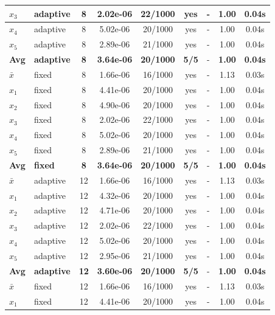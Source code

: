 \begin{longtable}{|l|l|c|c|c|c|c|c|c|}
\hline
$x_3$ & adaptive & 8 & 2.02e-06 & 22/1000 & yes & - & 1.00 & 0.04s \\
\hline
$x_4$ & adaptive & 8 & 5.02e-06 & 20/1000 & yes & - & 1.00 & 0.04s \\
\hline
$x_5$ & adaptive & 8 & 2.89e-06 & 21/1000 & yes & - & 1.00 & 0.04s \\
\hline
\hline\hline
\textbf{Avg} & \textbf{adaptive} & \textbf{8} & \textbf{3.64e-06} & \textbf{20/1000} & \textbf{5/5} & - & \textbf{1.00} & \textbf{0.04s} \\
\hline\hline
\hline
$\bar{x}$ & fixed & 8 & 1.66e-06 & 16/1000 & yes & - & 1.13 & 0.03s \\
\hline
$x_1$ & fixed & 8 & 4.41e-06 & 20/1000 & yes & - & 1.00 & 0.04s \\
\hline
$x_2$ & fixed & 8 & 4.90e-06 & 20/1000 & yes & - & 1.00 & 0.04s \\
\hline
$x_3$ & fixed & 8 & 2.02e-06 & 22/1000 & yes & - & 1.00 & 0.04s \\
\hline
$x_4$ & fixed & 8 & 5.02e-06 & 20/1000 & yes & - & 1.00 & 0.04s \\
\hline
$x_5$ & fixed & 8 & 2.89e-06 & 21/1000 & yes & - & 1.00 & 0.04s \\
\hline
\hline\hline
\textbf{Avg} & \textbf{fixed} & \textbf{8} & \textbf{3.64e-06} & \textbf{20/1000} & \textbf{5/5} & - & \textbf{1.00} & \textbf{0.04s} \\
\hline\hline
$\bar{x}$ & adaptive & 12 & 1.66e-06 & 16/1000 & yes & - & 1.13 & 0.03s \\
\hline
$x_1$ & adaptive & 12 & 4.32e-06 & 20/1000 & yes & - & 1.00 & 0.04s \\
\hline
$x_2$ & adaptive & 12 & 4.71e-06 & 20/1000 & yes & - & 1.00 & 0.04s \\
\hline
$x_3$ & adaptive & 12 & 2.02e-06 & 22/1000 & yes & - & 1.00 & 0.04s \\
\hline
$x_4$ & adaptive & 12 & 5.02e-06 & 20/1000 & yes & - & 1.00 & 0.04s \\
\hline
$x_5$ & adaptive & 12 & 2.95e-06 & 21/1000 & yes & - & 1.00 & 0.04s \\
\hline
\hline\hline
\textbf{Avg} & \textbf{adaptive} & \textbf{12} & \textbf{3.60e-06} & \textbf{20/1000} & \textbf{5/5} & - & \textbf{1.00} & \textbf{0.04s} \\
\hline\hline
\hline
$\bar{x}$ & fixed & 12 & 1.66e-06 & 16/1000 & yes & - & 1.13 & 0.03s \\
\hline
$x_1$ & fixed & 12 & 4.41e-06 & 20/1000 & yes & - & 1.00 & 0.04s \\

\end{longtable}
